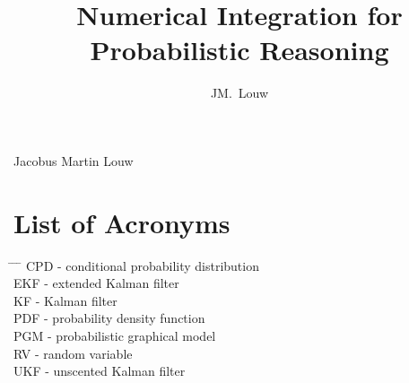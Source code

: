 \documentclass[12pt,oneside,openany,a4paper, %
afrikaans,english,
]{memoir}
\numberwithin{equation}{chapter}
\newcommand*{\WaterMark}[2][0.15\paperwidth]{%
\AddToShipoutPicture*{\AtTextCenter{%
\parbox[c]{0pt}{\makebox[0pt][c]{%
\texttt{[image: \#2]}}}}}}
\begin{document}
\pagestyle{plain}
\frontmatter
\title{Numerical Integration for Probabilistic Reasoning}
\author{JM.\ Louw}{Jacobus Martin Louw}
\frontmatter
\TitlePage

\DeclarationPage

\address{Department of Electrical and Electronic Engineering,\\
University of Stellenbosch,\\
Private Bag X1, 7602 Matieland, South Africa.}
\newpage

\tableofcontents
{}
\pagebreak
\listoffigures

\chapter{List of Acronyms}

\begin{tabbing}
\hspace*{1em}\= \hspace*{5em} \= \hspace*{3em} \= \kill %
\> CPD	\> - \> conditional probability distribution\\
\> EKF	\> - \> extended Kalman filter\\
\> KF	\> - \> Kalman filter\\
\> PDF	\> - \> probability density function\\
\> PGM	\> - \> probabilistic graphical model\\
\> RV \> - \>	random variable\\
\> UKF	\> - \> unscented Kalman filter\\
\end{tabbing}
\end{document}
